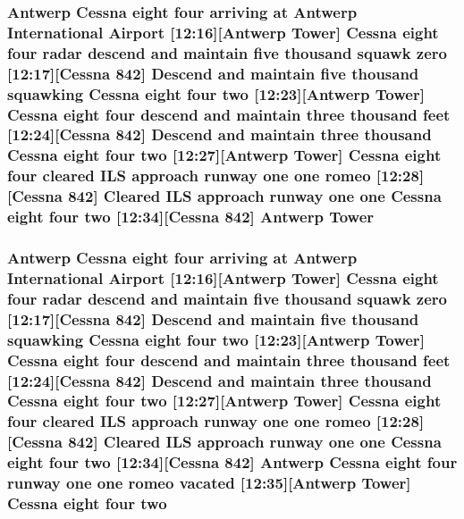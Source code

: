 \subsubsection[{\texorpdfstring{Tower}{Tower}}]{\setlength{\rightskip}{0pt plus 5cm}Antwerp {\bf Cessna} eight four arriving at Antwerp International {\bf Airport} \mbox{[}12\+:16\mbox{]}\mbox{[}Antwerp Tower\mbox{]} {\bf Cessna} eight four radar descend and maintain five {\bf thousand} squawk {\bf zero} \mbox{[}12\+:17\mbox{]}\mbox{[}{\bf Cessna} 842\mbox{]} Descend and maintain five {\bf thousand} {\bf squawking} {\bf Cessna} eight four {\bf two} \mbox{[}12\+:23\mbox{]}\mbox{[}Antwerp Tower\mbox{]} {\bf Cessna} eight four descend and maintain three {\bf thousand} {\bf feet} \mbox{[}12\+:24\mbox{]}\mbox{[}{\bf Cessna} 842\mbox{]} Descend and maintain three {\bf thousand} {\bf Cessna} eight four {\bf two} \mbox{[}12\+:27\mbox{]}\mbox{[}Antwerp Tower\mbox{]} {\bf Cessna} eight four cleared I\+LS approach runway {\bf one} {\bf one} {\bf romeo} \mbox{[}12\+:28\mbox{]}\mbox{[}{\bf Cessna} 842\mbox{]} Cleared I\+LS approach runway {\bf one} {\bf one} {\bf Cessna} eight four {\bf two} \mbox{[}12\+:34\mbox{]}\mbox{[}{\bf Cessna} 842\mbox{]} Antwerp Tower}\hypertarget{happyDay1ATC_8txt_a1eb79599ee2cca5bc8c8adc87a257c7c}{}\label{happyDay1ATC_8txt_a1eb79599ee2cca5bc8c8adc87a257c7c}
\subsubsection[{\texorpdfstring{two}{two}}]{\setlength{\rightskip}{0pt plus 5cm}Antwerp {\bf Cessna} eight four arriving at Antwerp International {\bf Airport} \mbox{[}12\+:16\mbox{]}\mbox{[}Antwerp {\bf Tower}\mbox{]} {\bf Cessna} eight four radar descend and maintain five {\bf thousand} squawk {\bf zero} \mbox{[}12\+:17\mbox{]}\mbox{[}{\bf Cessna} 842\mbox{]} Descend and maintain five {\bf thousand} {\bf squawking} {\bf Cessna} eight four two \mbox{[}12\+:23\mbox{]}\mbox{[}Antwerp {\bf Tower}\mbox{]} {\bf Cessna} eight four descend and maintain three {\bf thousand} {\bf feet} \mbox{[}12\+:24\mbox{]}\mbox{[}{\bf Cessna} 842\mbox{]} Descend and maintain three {\bf thousand} {\bf Cessna} eight four two \mbox{[}12\+:27\mbox{]}\mbox{[}Antwerp {\bf Tower}\mbox{]} {\bf Cessna} eight four cleared I\+LS approach runway {\bf one} {\bf one} {\bf romeo} \mbox{[}12\+:28\mbox{]}\mbox{[}{\bf Cessna} 842\mbox{]} Cleared I\+LS approach runway {\bf one} {\bf one} {\bf Cessna} eight four two \mbox{[}12\+:34\mbox{]}\mbox{[}{\bf Cessna} 842\mbox{]} Antwerp {\bf Cessna} eight four runway {\bf one} {\bf one} {\bf romeo} vacated \mbox{[}12\+:35\mbox{]}\mbox{[}Antwerp {\bf Tower}\mbox{]} {\bf Cessna} eight four two}\hypertarget{happyDay1ATC_8txt_aa0469efe401676f277c03bf9d9d4a983}{}\label{happyDay1ATC_8txt_aa0469efe401676f277c03bf9d9d4a983}
